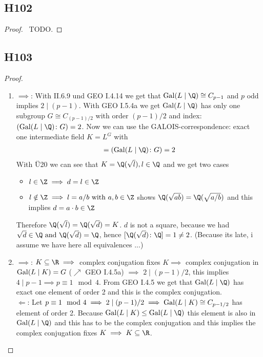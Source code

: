 \subsection{H102}
\begin{proof}\
	TODO.
\end{proof}

\subsection{H103}
\begin{proof}\
	\begin{enumerate}
		\item $\implies$: With II.6.9 und GEO I.4.14 we get that $\Gal(L\mid \Q) \cong C_{p-1}$ and $p$ odd implies $2 \mid (p-1)$. With GEO I.5.4a we get $\Gal(L\mid \Q)$ has only one subgroup $G \cong C_{(p-1)/2}$ with order $(p-1)/2$ and index: $(\Gal(L \mid \Q)\colon G) = 2$. Now we can use the GALOIS-correspondence: exact one intermediate field $K=L^G$ with
		\begin{align*}
		[K\colon\Q] = (\Gal(L \mid \Q)\colon G) = 2
		\end{align*}
		With Ü20 we can see that $K=\Q(\sqrt{l}), l \in \Q$ and we get two cases
		\begin{itemize}
			\item $l \in \Z \implies d= l \in \Z$
			\item $l \notin \Z \implies l = a/b \with a,b \in \Z$ shows $\Q(\sqrt{ab}) = \Q(\sqrt{a/b})$ and this implies $d=a\cdot b \in \Z$
		\end{itemize}
		Therefore $\Q(\sqrt{l}) = \Q(\sqrt{d}) = K$. $d$ is not a square, because we had $\sqrt{d} \in \Q \and \Q(\sqrt{d}) = \Q$, hence $[\Q(\sqrt{d})\colon \Q] = 1 \neq 2$. (Because its late, i assume we have here all equivalences ...)
		\item $\implies$: $K \subseteq \R \implies$ complex conjugation fixes $K \implies$ complex conjugation in $\operatorname{Gal}(L \mid K) = G$ ($\nearrow$ GEO I.4.5a) $\implies$ $2 \mid (p-1)/2$, this implies $4 \mid p-1 \implies p \equiv 1 \mod 4$. From GEO I.4.5 we get that $\Gal(L \mid \Q)$ has exact one element of order 2 and this is the complex conjugation.\\
		$\Longleftarrow$: Let $p \equiv 1 \mod 4 \implies 2 \mid (p-1)/2 \implies \operatorname{Gal}(L \mid K) \cong C_{p-1/2}$ has element of order 2. Because $\Gal(L\mid K) \le \Gal(L\mid \Q)$ this element is also in $\Gal(L \mid \Q)$ and this has to be the complex conjugation and this implies the complex conjugation fixes $K \implies K \subseteq \R$.
	\end{enumerate}
\end{proof}
